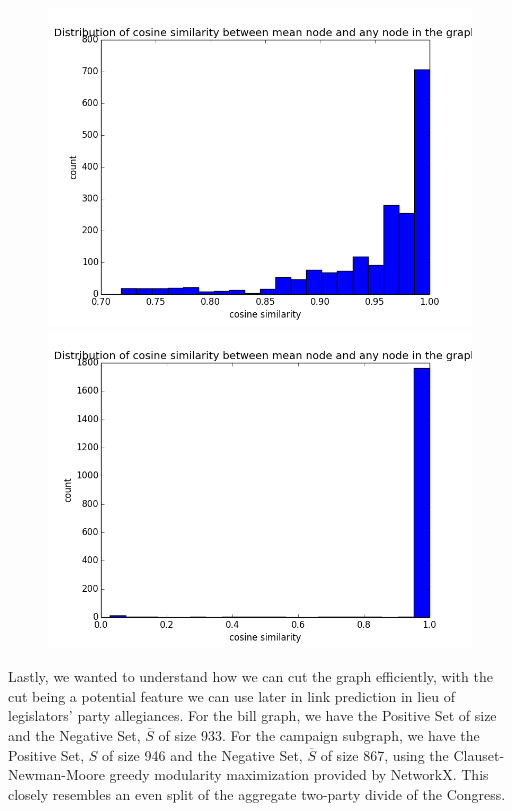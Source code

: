 \documentclass[12pt,twocolumn]{article}
\begin{document}
\begin{figure}
\centering
\begin{minipage}{0.45\linewidth}

\includegraphics[width=\linewidth]{bill_role}
\caption{}
\label{fig:billrole}
\end{minipage}\hfill
\begin{minipage}{0.45\linewidth}

\includegraphics[width=\linewidth]{campaign_role}
\caption{}
\label{fig:campaignrole}
 \end{minipage}
\end{figure}


Lastly, we wanted to understand how we can cut the graph efficiently, with the cut being a potential feature we can use later in link prediction in lieu of legislators' party allegiances. For the bill graph, we have the Positive Set of size  and the Negative Set, $\overline{S}$ of size 933. For the campaign subgraph, we have the Positive Set, $S$ of size 946 and the Negative Set, $\overline{S}$ of size 867, using the Clauset-Newman-Moore greedy modularity maximization provided by NetworkX. This closely resembles an even split of the aggregate two-party divide of the Congress. 
\end{document}
